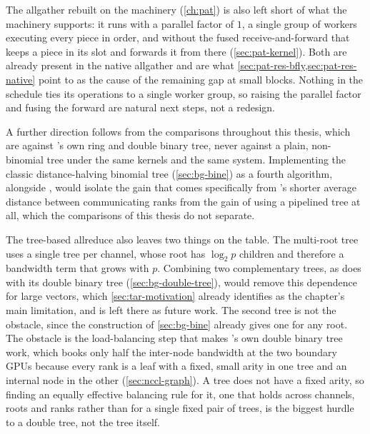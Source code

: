 The allgather rebuilt on the \pat{} machinery (\cref{ch:pat}) is also left short of what the machinery supports: it runs with a parallel factor of $1$, a single group of workers executing every piece in order, and without the fused receive-and-forward that keeps a piece in its slot and forwards it from there (\cref{sec:pat-kernel}).
Both are already present in the native \pat{} allgather and are what \cref{sec:pat-res-bfly,sec:pat-res-native} point to as the cause of the remaining gap at small blocks. Nothing in the \bine{} schedule ties its operations to a single worker group, so raising the parallel factor and fusing the forward are natural next steps, not a redesign.

A further direction follows from the comparisons throughout this thesis, which are against \nccl{}'s own ring and double binary tree, never against a plain, non-\bine{} binomial tree under the same kernels and the same system.
Implementing the classic distance-halving binomial tree (\cref{sec:bg-bine}) as a fourth \nccl{} algorithm, alongside \bine{}, would isolate the gain that comes specifically from \bine{}'s shorter average distance between communicating ranks from the gain of using a pipelined tree at all, which the comparisons of this thesis do not separate.

The tree-based allreduce also leaves two things on the table.
The multi-root tree uses a single \bine{} tree per channel, whose root has $\log_2p$ children and therefore a bandwidth term that grows with $p$. Combining two complementary trees, as \nccl{} does with its double binary tree (\cref{sec:bg-double-tree}), would remove this dependence for large vectors, which \cref{sec:tar-motivation} already identifies as the chapter's main limitation, and is left there as future work.
The second tree is not the obstacle, since the construction of \cref{sec:bg-bine} already gives one for any root. The obstacle is the load-balancing step that makes \nccl{}'s own double binary tree work, which books only half the inter-node bandwidth at the two boundary GPUs because every rank is a leaf with a fixed, small arity in one tree and an internal node in the other (\cref{sec:nccl-graph}).
A \bine{} tree does not have a fixed arity, so finding an equally effective balancing rule for it, one that holds across channels, roots and ranks rather than for a single fixed pair of trees, is the biggest hurdle to a \bine{} double tree, not the tree itself.

